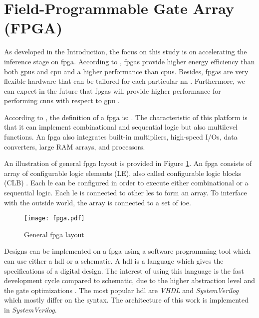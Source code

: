 \section{Field-Programmable Gate Array (FPGA)} \label{sec:fpga}
%
%
As developed in the Introduction, the focus on this study is on accelerating the inference stage on \acrshort{fpga}. According to \textcite{mittal_survey_2015}, \acrshort{fpga}s provide higher energy efficiency than both \acrshort{gpu}s and \acrshort{cpu} and a higher performance than \acrshort{cpu}s. Besides, \acrshort{fpga}s are very flexible hardware that can be tailored for each particular \acrshort{nn} \cite{vestias_fast_2019}. Furthermore, we can expect in the future that \acrshort{fpga}s will provide higher performance for performing \acrshort{cnn}s with respect to \acrshort{gpu} \cite{nurvitadhi_can_2017}.

According to \textcite{harris_digital_2015}, the definition of a \acrshort{fpga} is: . The characteristic of this platform is that it can implement combinational and sequential logic but also multilevel functions. An \acrshort{fpga} also integrates built-in multipliers, high-speed I/Os, data converters, large RAM arrays, and processors.

An illustration of general \acrshort{fpga} layout is provided in Figure \ref{fig:fpga}. An \acrshort{fpga} consists of array of configurable logic elements (LE), also called configurable logic blocks (CLB) \cite{harris_digital_2015}. Each \acrshort{le} can be configured in order to execute either combinational or a sequential logic. Each \acrshort{le} is connected to other \acrshort{le}s to form an array. To interface with the outside world, the array is connected to a set of \acrfull{ioe}.
%
\begin{figure}[H]
    \centering
    \texttt{[image: fpga.pdf]}
    \caption{General \acrshort{fpga} layout \cite{harris_digital_2015}}
    \label{fig:fpga}
\end{figure}

Designs can be implemented on a \acrshort{fpga} using a software programming tool which can use either a \acrfull{hdl} or a schematic. A \acrshort{hdl} is a language which gives the specifications of a digital design. The interest of using this language is the fast development cycle compared to schematic, due to the higher abstraction level and the gate optimizations \cite{harris_digital_2015}. The most popular \acrshort{hdl} are \textit{VHDL} and \textit{SystemVerilog} which mostly differ on the syntax. The architecture of this work is implemented in \textit{SystemVerilog}. 

